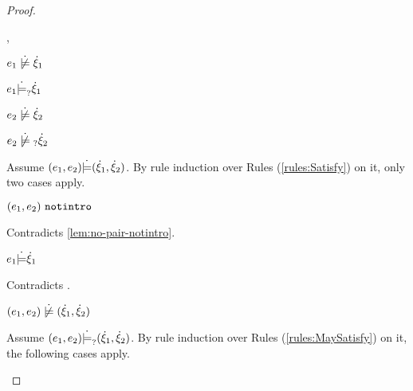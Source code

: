 \begin{proof}
\begin{byCases}
\begin{byCases}
\begin{byCases}
        \item[\cmaysatisfy{e_1}{\hxi_1},\cnotsatisfyormay{e_2}{\hxi_2}]
            \begin{pfsteps*}
            \item $\cnotsatisfy{e_1}{\hxi_1}$  
            \item $e_1 \dot{\models}_{?} \dot{\xi}_1$  
            \item $\cnotsatisfy{e_2}{\hxi_2}$  
            \item $\cnotmaysatisfy{e_2}{\hxi_2}$  
            \end{pfsteps*}
            Assume $(e_1 , e_2) \dot{\models} (\dot{\xi}_1 , \dot{\xi}_2)$. By rule induction over Rules (\ref{rules:Satisfy}) on it, only two cases apply. 
           \begin{byCases}
            \item[\text{(\ref{rule:CSNotIntroPair})}]
                \begin{pfsteps*}
                \item $(e_1 , e_2) ~\mathtt{notintro}$ 
                \end{pfsteps*}
                Contradicts \autoref{lem:no-pair-notintro}.
            \item[\text{(\ref{rule:CSPair})}]
                \begin{pfsteps*}
                \item $e_1 \dot{\models} \dot{\xi}_1$ 
                \end{pfsteps*}
                Contradicts .
            \end{byCases}
            \begin{pfsteps*}
            \item $\cnotsatisfy{\hpair{e_1}{e_2}}{\cpair{\hxi_1}{\hxi_2}}$  
            \end{pfsteps*}
            Assume $(e_1 , e_2) \dot{\models}_{?} (\dot{\xi}_1 , \dot{\xi}_2)$. By rule induction over Rules (\ref{rules:MaySatisfy}) on it, the following cases apply.
            \begin{byCases}
            \item[\text{(\ref{rule:CMSNotIntro})}]

\end{byCases}
\end{byCases}
\end{byCases}
\end{byCases}
\end{proof}
